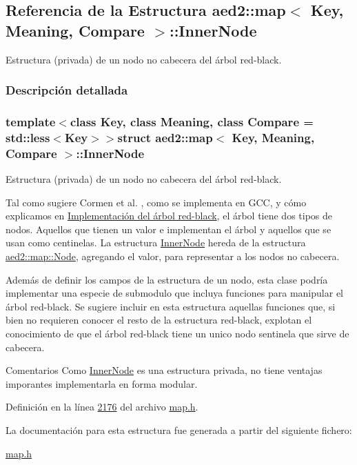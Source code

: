 \hypertarget{structaed2_1_1map_1_1InnerNode}{\subsection{\-Referencia de la \-Estructura aed2\-:\-:map$<$ \-Key, \-Meaning, \-Compare $>$\-:\-:\-Inner\-Node}
\label{structaed2_1_1map_1_1InnerNode}
}


\-Estructura (privada) de un nodo no cabecera del árbol red-\/black.  




\subsubsection{\-Descripción detallada}
\subsubsection*{template$<$class \-Key, class \-Meaning, class \-Compare = std\-::less$<$\-Key$>$$>$struct aed2\-::map$<$ Key, Meaning, Compare $>$\-::\-Inner\-Node}

\-Estructura (privada) de un nodo no cabecera del árbol red-\/black. 

\-Tal como sugiere \-Cormen et al. \cite{CormenLeisersonRivestStein2009}, como se implementa en \-G\-C\-C, y cómo explicamos en \hyperlink{Implementacion}{\-Implementación del árbol red-\/black}, el árbol tiene dos tipos de nodos. \-Aquellos que tienen un valor e implementan el árbol y aquellos que se usan como centinelas. \-La estructura \hyperlink{structaed2_1_1map_1_1InnerNode}{\-Inner\-Node} hereda de la estructura \hyperlink{structaed2_1_1map_1_1Node}{aed2\-::map\-::\-Node}, agregando el valor, para representar a los nodos no cabecera.

\-Además de definir los campos de la estructura de un nodo, esta clase podría implementar una especie de submodulo que incluya funciones para manipular el árbol red-\/black. \-Se sugiere incluir en esta estructura aquellas funciones que, si bien no requieren conocer el resto de la estructura red-\/black, explotan el conocimiento de que el árbol red-\/black tiene un unico nodo sentinela que sirve de cabecera.

\begin{DoxyRemark}{\-Comentarios}
\-Como \hyperlink{structaed2_1_1map_1_1InnerNode}{\-Inner\-Node} es una estructura privada, no tiene ventajas imporantes implementarla en forma modular. 
\end{DoxyRemark}


\-Definición en la línea \hyperlink{map_8h_source_l02176}{2176} del archivo \hyperlink{map_8h_source}{map.\-h}.



\-La documentación para esta estructura fue generada a partir del siguiente fichero\-:\begin{DoxyCompactItemize}
\item 
\hyperlink{map_8h}{map.\-h}\end{DoxyCompactItemize}
